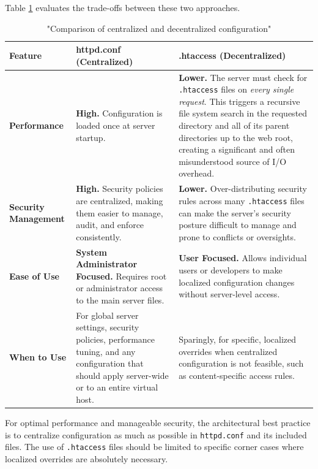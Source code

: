 \documentclass{scrbook}
\begin{document}
	Table \ref{tbl:centralized_vs_decentralized} evaluates the trade-offs between these two approaches.\\
	
	\begin{table}[h]
		\centering
		\tiny
		\begin{tabularx}{\linewidth}{|p{3cm}|X|X|}
			\hline
			\textbf{Feature} & \textbf{httpd.conf (Centralized)} & \textbf{.htaccess (Decentralized)} \\
			\hline
			
			\textbf{Performance} &
			\textbf{High.} Configuration is loaded once at server startup. &
			\textbf{Lower.} The server must check for \texttt{.htaccess} files on
			\textit{every single request}. This triggers a recursive file system search in
			the requested directory and all of its parent directories up to the web root,
			creating a significant and often misunderstood source of I/O overhead. \\
			\hline
			
			\textbf{Security Management} &
			\textbf{High.} Security policies are centralized, making them easier to manage,
			audit, and enforce consistently. &
			\textbf{Lower.} Over-distributing security rules across many \texttt{.htaccess}
			files can make the server's security posture difficult to manage and prone to
			conflicts or oversights. \\
			\hline
			
			\textbf{Ease of Use} &
			\textbf{System Administrator Focused.} Requires root or administrator access to
			the main server files. &
			\textbf{User Focused.} Allows individual users or developers to make localized
			configuration changes without server-level access. \\
			\hline
			
			\textbf{When to Use} &
			For global server settings, security policies, performance tuning, and any
			configuration that should apply server-wide or to an entire virtual host. &
			Sparingly, for specific, localized overrides when centralized configuration is
			not feasible, such as content-specific access rules. \\
			\hline
		\end{tabularx}
		\caption{"Comparison of centralized and decentralized configuration"}
		\label{tbl:centralized_vs_decentralized}
	\end{table}
	
	For optimal performance and manageable security, the architectural best practice is to
	centralize configuration as much as possible in \texttt{httpd.conf} and its included
	files. The use of \texttt{.htaccess} files should be limited to specific corner cases where
	localized overrides are absolutely necessary.\\
	
\end{document}
